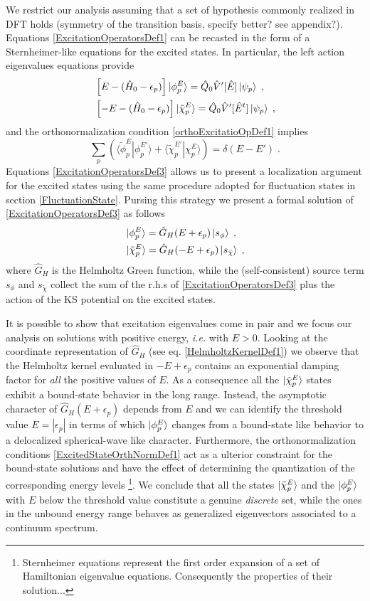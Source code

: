\documentclass[reprint,aps,prb]{revtex4-1}
\newcommand{\eps}{\epsilon}
\newcommand{\be}{\begin{equation}}
\newcommand{\ee}{\end{equation}}
\newcommand{\nn}{\notag}
\newcommand{\lb}{\label}
\newcommand{\op}[1]{\hat {#1}}
\newcommand{\brket}[2]{\langle  #1 | #2 \rangle} %
\newcommand{\hnot}{\op{H}_0}
\begin{document}
We restrict our analysis assuming that a set of hypothesis commonly realized in DFT holds (symmetry of the transition basis, specify better? see appendix?). Equations 
\eqref{ExcitationOperatorsDef1} can be recasted in the form of a Sternheimer-like equations for the excited states. In particular, the left action eigenvalues equations provide   
\begin{align}\lb{ExcitationOperatorsDef3}
&\left[E-(\hnot - \eps_p)\right] \ket{\phi_p^E} = \op Q_0 \op V'[\op E] \ket{\psi_p} \;, \nn\\
&\left[-E-(\hnot - \eps_p)\right]\ket{\tilde\chi_p^E} = \op Q_0\op V'[\op E^t]\ket{\psi_p}  \;, 
\end{align}
and the orthonormalization condition \eqref{orthoExcitatioOpDef1} implies %
\be\lb{ExcitedStateOrthNormDef1}
\sum_p \left(\brket{\tilde\phi_p^E}{\phi_p^{E'}} + \brket{\tilde\chi_p^{E'}}{\chi_p^E}\right) = \delta(E-E') \;. 
\ee
Equations \eqref{ExcitationOperatorsDef3} allows us to present a localization argument for the excited states using the same procedure adopted for fluctuation states in 
section \ref{FluctuationState}. Pursing this strategy we present a formal solution of \eqref{ExcitationOperatorsDef3} as follows 
\begin{align}
&\ket{\phi^E_p} = \op G_H(E+\eps_p)\ket{s_{\phi}} \;, \nn \\
&\ket{\tilde\chi^E_p} = \op G_H(-E+\eps_p)\ket{s_{\tilde\chi}} \;,
\end{align}
where $\op G_H$ is the Helmholtz Green function, while the (self-consistent) source term $s_\phi$ and $s_{\tilde\chi}$ collect the sum of the r.h.s of \eqref{ExcitationOperatorsDef3} 
plus the action of the KS potential on the excited states. 

It is possible to show that excitation eigenvalues come in pair and we focus our analysis on solutions with positive energy, \emph{i.e.} with $E>0$. Looking at the coordinate representation 
of $\op G_H$ (see eq. \eqref{HelmholtzKernelDef1}) we observe that the Helmholtz kernel evaluated in $-E+\eps_p$ contains an exponential damping factor for \emph{all} the positive values of $E$. 
As a consequence all the $\ket{\tilde\chi^E_p}$ states exhibit a bound-state behavior in the long range. Instead, the asymptotic character of $\op G_H(E+\eps_p)$ depends from $E$ and we can 
identify the threshold value $E=|\eps_p|$ in terms of which $\ket{\phi^E_p}$ changes from a bound-state like behavior to a delocalized spherical-wave like character.  
Furthermore, the orthonormalization conditions \eqref{ExcitedStateOrthNormDef1} act as a ulterior constraint for the bound-state solutions and have the effect of determining the quantization of 
the corresponding energy levels \footnote{Sternheimer equations represent the first order expansion of a set of Hamiltonian eigenvalue equations. Consequently the properties of their solution...}.
We conclude that all the states $\ket{\tilde\chi^E_p}$ and the $\ket{\phi^E_p}$ with $E$ below the threshold value constitute a genuine \emph{discrete} set, while the ones in the unbound 
energy range behaves as generalized eigenvectors associated to a continuum spectrum. 
\end{document}

